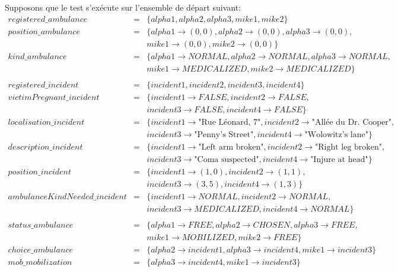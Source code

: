 \documentclass{report}
\begin{document}
Supposons que le test s'exécute sur l'ensemble de départ suivant:
\begin{eqnarray*}
registered\_ambulance &=& \{alpha1, alpha2, alpha3, mike1, mike2\}\\
position\_ambulance &=& \{alpha1 \rightarrow (0,0), alpha2 \rightarrow (0,0), alpha3 \rightarrow (0,0), \\ 
	&& mike1 \rightarrow (0,0), mike2 \rightarrow (0,0)\}\\
kind\_ambulance &=& \{alpha1 \rightarrow NORMAL, alpha2 \rightarrow NORMAL, alpha3 \rightarrow NORMAL, \\ 
	&& mike1 \rightarrow MEDICALIZED, mike2 \rightarrow MEDICALIZED\} \\
\\
registered\_incident &=& \{incident1, incident2, incident3, incident4\}\\
victimPregnant\_incident &=& \{incident1 \rightarrow FALSE, incident2\rightarrow FALSE, \\ 
	&& incident3\rightarrow FALSE, incident4\rightarrow FALSE\}\\
localisation\_incident &=& \{incident1 \rightarrow \text{"Rue Léonard, 7"}, incident2 \rightarrow \text{"Allée du Dr. Cooper"},\\ 
	&&  incident3  \rightarrow \text{"Penny's Street"}, incident4 \rightarrow \text{"Wolowitz's lane"}\}\\
description\_incident &=& \{incident1 \rightarrow \text{"Left arm broken"}, incident2 \rightarrow \text{"Right leg broken"},\\ 
	&&  incident3 \rightarrow \text{"Coma suspected"}, incident4 \rightarrow \text{"Injure at head"}\}\\
position\_incident &=& \{incident1 \rightarrow (1,0), incident2 \rightarrow (1,1),\\ 
	&&  incident3 \rightarrow (3,5), incident4 \rightarrow (1,3)\}\\
ambulanceKindNeeded\_incident &=& \{incident1 \rightarrow NORMAL, incident2 \rightarrow NORMAL, \\ 
	&& incident3 \rightarrow MEDICALIZED, incident4 \rightarrow NORMAL\}\\
\\
status\_ambulance &=& \{alpha1 \rightarrow FREE, alpha2 \rightarrow CHOSEN, alpha3 \rightarrow FREE, \\ 
	&& mike1 \rightarrow MOBILIZED, mike2 \rightarrow FREE\} \\
choice\_ambulance &=& \{alpha2 \rightarrow incident1, alpha3 \rightarrow incident4, mike1 \rightarrow incident3\} \\
mob\_mobilization &=& \{alpha3 \rightarrow incident4, mike1 \rightarrow incident3\} \\
\end{eqnarray*}
\end{document}
